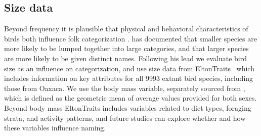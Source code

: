 \documentclass[10pt,letterpaper]{article}
\begin{document}
\subsection{Size data}
Beyond frequency it is plausible that physical and behavioral characteristics of birds both influence folk categorization \cite{amadon1943bird,alcantara2016ecological}.  has documented that smaller species are more likely to be lumped together into large categories, and that larger species are more likely to be given distinct names. Following his lead we evaluate bird size as an influence on categorization, and use size data from EltonTraits~\cite{wilman2014eltontraits} which includes information on key attributes for all 9993 extant bird species, including those from Oaxaca.  We use the body mass variable, separately sourced from \cite{dunning2007crc}, which is defined as the geometric mean of average values provided for both sexes. Beyond body mass EltonTraits includes variables related to diet types, foraging strata, and activity patterns, and future studies can explore whether and how these variables influence naming. 

%
%
\end{document}
